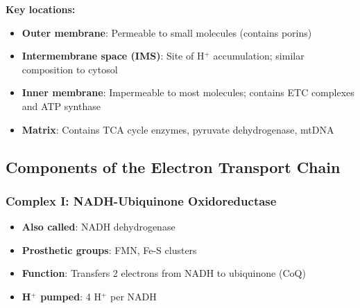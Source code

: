 \begin{center}
\end{center}

\textbf{Key locations:}
\begin{itemize}
    \item \textbf{Outer membrane}: Permeable to small molecules (contains porins)
    \item \textbf{Intermembrane space (IMS)}: Site of H$^+$ accumulation; similar composition to cytosol
    \item \textbf{Inner membrane}: Impermeable to most molecules; contains ETC complexes and ATP synthase
    \item \textbf{Matrix}: Contains TCA cycle enzymes, pyruvate dehydrogenase, mtDNA
\end{itemize}

\subsection{Components of the Electron Transport Chain}

\subsubsection{Complex I: NADH-Ubiquinone Oxidoreductase}

\begin{itemize}
    \item \textbf{Also called}: NADH dehydrogenase
    \item \textbf{Prosthetic groups}: FMN, Fe-S clusters
    \item \textbf{Function}: Transfers 2 electrons from NADH to ubiquinone (CoQ)
    \item \textbf{H$^+$ pumped}: 4 H$^+$ per NADH
\end{itemize}


